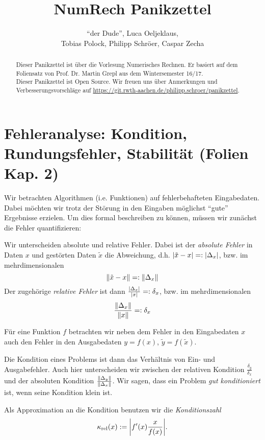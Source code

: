 \documentclass[a4paper,parskip=half*,DIV=7,fontsize=11pt]{scrartcl}
\title{NumRech Panikzettel}
\author{``der Dude'', Luca Oeljeklaus,\\ Tobias Polock, Philipp Schröer, Caspar Zecha \blfootnote{Pseudonyme gehören anonymen Autoren, die anonym bleiben wollen.}}
\DeclarePairedDelimiter\abs{\lvert}{\rvert}
\DeclarePairedDelimiter\norm{\lVert}{\rVert}
\begin{document}
\maketitle

\begin{abstract}
Dieser Panikzettel ist über die Vorlesung Numerisches Rechnen. Er basiert auf dem Foliensatz von Prof. Dr. Martin Grepl aus dem Wintersemester 16/17.	\\
Dieser Panikzettel ist Open Source. Wir freuen uns über Anmerkungen und Verbesserungsvorschläge auf \url{https://git.rwth-aachen.de/philipp.schroer/panikzettel}.
\end{abstract}

\tableofcontents

\newpage

\section{Fehleranalyse: Kondition, Rundungsfehler, Stabilität (Folien Kap. 2)}

Wir betrachten Algorithmen (i.e. Funktionen) auf fehlerbehafteten Eingabedaten. Dabei möchten wir trotz der Störung in den Eingaben möglichst ``gute'' Ergebnisse erzielen. Um dies formal beschreiben zu können, müssen wir zunächst die Fehler quantifizieren:

Wir unterscheiden absolute und relative Fehler. Dabei ist der \emph{absolute Fehler} in Daten $x$ und gestörten Daten $\tilde{x}$ die Abweichung, d.h. $\abs{\tilde{x}-x} =: \abs{\Delta_x}$, bzw. im mehrdimensionalen
\[\norm{\tilde{x}-x} =: \norm{\Delta_x}\]
Der zugehörige \emph{relative Fehler} ist dann $\frac{\abs{\Delta_x}}{\abs{x}} =: \delta_x$, bzw. im mehrdimensionalen
\[\frac{\norm{\Delta_x}}{\norm{x}} =: \delta_x\]

Für eine Funktion $f$ betrachten wir neben dem Fehler in den Eingabedaten $x$ auch den Fehler in den Ausgabedaten $y = f(x)$, $\tilde{y} = f(\tilde{x})$.

Die Kondition eines Problems ist dann das Verhältnis von Ein- und Ausgabefehler. Auch hier unterscheiden wir zwischen der relativen Kondition $\frac{\delta_y}{\delta_x}$ und der absoluten Kondition $\frac{\norm{\Delta_y}}{\norm{\Delta_x}}$. Wir sagen, dass ein Problem \emph{gut konditioniert} ist, wenn seine Kondition klein ist.

Als Approximation an die Kondition benutzen wir die \emph{Konditionszahl}
\[\kappa_{\text{rel}}(x) := \abs*{f'(x)\frac{x}{f(x)}}.\]
\end{document}
